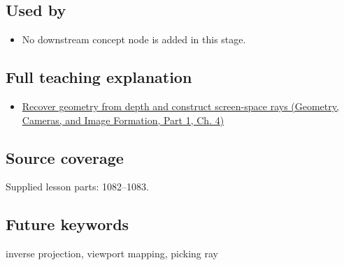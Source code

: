 \subsection{Used by}\label{appendix-f1a6d43e80d1-used-by}

\hypertarget{appendix-f1a6d43e80d1-used-by}{}

\begin{itemize}
\tightlist
\item
  No downstream concept node is added in this stage.
\end{itemize}

\subsection{Full teaching explanation}\label{appendix-f1a6d43e80d1-full-teaching-explanation}

\hypertarget{appendix-f1a6d43e80d1-full-teaching-explanation}{}

\begin{itemize}
\tightlist
\item
  \href{../03-Geometry-Cameras-and-Image-Formation-P01/main.pdf\#nameddest=02-foundations-ii-ch035-recover-geometry-from-depth-and-construct-screen-space-rays}{Recover geometry from depth and construct screen-space rays (Geometry, Cameras, and Image Formation, Part 1, Ch. 4)}
\end{itemize}

\subsection{Source coverage}\label{appendix-f1a6d43e80d1-source-coverage}

\hypertarget{appendix-f1a6d43e80d1-source-coverage}{}

Supplied lesson parts: 1082--1083.

\subsection{Future keywords}\label{appendix-f1a6d43e80d1-future-keywords}

\hypertarget{appendix-f1a6d43e80d1-future-keywords}{}

inverse projection, viewport mapping, picking ray
